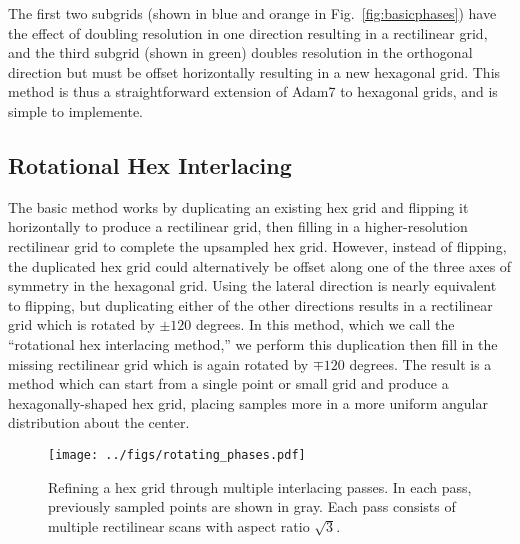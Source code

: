 \documentclass{article}
\newcommand{\reffig}[1]{Fig.~\ref{fig:#1}}
\begin{document}
%
The first two subgrids (shown in blue and orange in \reffig{basicphases}) have the effect of doubling resolution in one direction
resulting in a rectilinear grid, and the third subgrid (shown in green) doubles resolution in the orthogonal direction but must be
offset horizontally resulting in a new hexagonal grid.
%
This method is thus a straightforward extension of Adam7 to hexagonal grids, and
is simple to implemente.


\subsection{Rotational Hex Interlacing}
\label{triple-grid-interlacing}

The basic method works by duplicating an existing hex grid and flipping it horizontally to produce a rectilinear grid, then filling in a higher-resolution rectilinear grid to complete the upsampled hex grid.
%
However, instead of flipping, the duplicated hex grid could alternatively be offset along one of the three axes of symmetry in the hexagonal grid.
%
Using the lateral direction is nearly equivalent to flipping, but duplicating either of the other directions results in a rectilinear grid which is rotated by $\pm 120$ degrees.
%
In this method, which we call the ``rotational hex interlacing method,'' we perform this duplication then fill in the missing rectilinear grid which is again rotated by $\mp 120$ degrees.
%
The result is a method which can start from a single point or small grid and produce a hexagonally-shaped hex grid, placing samples more in a more uniform angular distribution about the center.



\begin{figure}[ht]
\centering
\texttt{[image: ../figs/rotating\_phases.pdf]}
\caption{
\label{fig:rotatingphases} Refining a hex grid through multiple interlacing passes.
%
In each pass, previously sampled points are shown in gray.
%
Each pass consists of multiple rectilinear scans with aspect ratio $\sqrt{3}$.
}
\end{figure}

\end{document}
